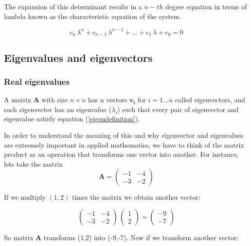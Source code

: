 \documentclass[12pt]{article}
\begin{document}
The expansion of this determinant results in a $n-th$ degree equation in terms of lambda known as the characteristic equation of the system.

\begin{equation}
c_n \, \lambda^n +c_{n-1} \, \lambda^{n-1}  + \dots  + c_1 \, \lambda + c_0 = 0 \nonumber
\end{equation}

\subsection{Eigenvalues and eigenvectors} 

\subsubsection{Real eigenvalues}
A matrix $\mathbf{A}$ with size $n \times n$ has n vectors $\mathbf{v_i}$ for $i = 1 \dots n$ called eigenvectors, and each eigenvector has an eigenvalue ($\lambda_i$) such that every pair of eigenvector and eigenvalue satisfy equation (\ref{eigendefinition}).
	
In order to understand the meaning of this and why eigenvector and eigenvalues are extremely important in applied mathematics, we have to think of the matrix product as an operation that transforms one vector into another. For instance, lets take the matrix
\begin{equation}
	\mathbf{A}  = \begin{pmatrix} -1 & -4\\ -3 & -2\end{pmatrix} \nonumber
\end{equation}

If we multiply $(1,2)$ times the matrix we obtain another vector:

\begin{equation}
	 \begin{pmatrix} -1 & -4\\ -3 & -2\end{pmatrix} \,  \begin{pmatrix} 1\\ 2\end{pmatrix}=\begin{pmatrix} -9 \\ -7\end{pmatrix}\nonumber
\end{equation}

So matrix $\mathbf{A}$ transforms  (1,2) into  (-9,-7). Now if  we transform another vector:
\end{document}
